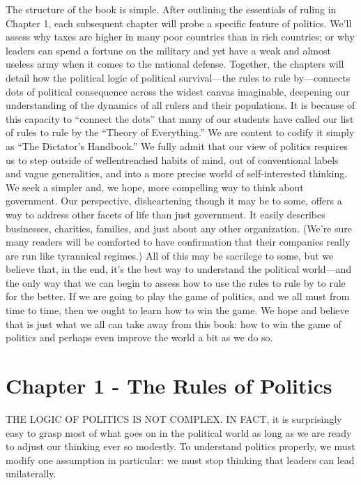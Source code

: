 \documentclass[10pt]{article}
\begin{document}
{\large The structure of the book is simple. After outlining the essentials of
ruling in Chapter 1, each subsequent chapter will probe a specific feature of
politics. We'll assess why taxes are higher in many poor countries than in rich
countries; or why leaders can spend a fortune on the military and yet have a weak
and almost useless army when it comes to the national defense. Together, the
chapters will detail how the political logic of political survival---the rules to
rule by---connects dots of political consequence across the widest canvas
imaginable, deepening our understanding of the dynamics of all rulers and their
populations. It is because of this capacity to ``connect the dots'' that many of
our students have called our list of rules to rule by the ``Theory of
Everything.'' We are content to codify it simply as ``The Dictator's Handbook.''
We fully admit that our view of politics requires us to step outside of
wellentrenched habits of mind, out of conventional labels and vague generalities,
and into a more precise world of self-interested thinking. We seek a simpler and,
we hope, more compelling way to think about government. Our perspective,
disheartening though it may be to some, offers a way to address other facets of
life than just government. It easily describes businesses, charities, families,
and just about any other organization. (We're sure many readers will be comforted
to have confirmation that their companies really are run like tyrannical
regimes.) All of this may be sacrilege to some, but we believe that, in the end,
it's the best way to understand the political world---and the only way that we
can begin to assess how to use the rules to rule by to rule for the better. If we
are going to play the game of politics, and we all must from time to time, then
we ought to learn how to win the game. We hope and believe that is just what we
all can take away from this book: how to win the game of politics and perhaps
even improve the world a bit as we do so.}
\pagebreak{}


\section{Chapter 1 - The Rules of Politics}

{\large THE LOGIC OF POLITICS IS NOT COMPLEX. IN FACT, it is surprisingly easy
to grasp most of what goes on in the political world as long as we are ready to
adjust our thinking ever so modestly. To understand politics properly, we must
modify one assumption in particular: we must stop thinking that leaders can lead
unilaterally.}
\end{document}
